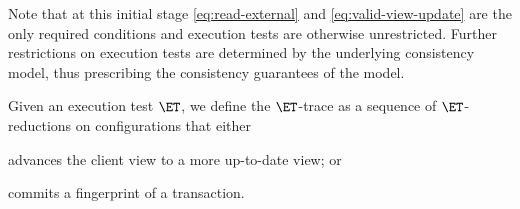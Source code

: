
Note that at this initial stage \eqref{eq:read-external} and \eqref{eq:valid-view-update} are the only required conditions and execution tests are otherwise unrestricted. 
Further restrictions on execution tests are determined by the underlying consistency model, thus prescribing the consistency guarantees of the model.

Given an execution test  $\ET$, we define the $\ET$-trace as a sequence of $\ET$-reductions on configurations that either 
\begin{enumerate*}
	\item advances the client view to a more up-to-date view; or 
	\item commits a fingerprint of a transaction. 
\end{enumerate*}


